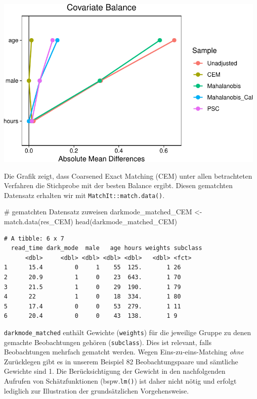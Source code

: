 \documentclass[
  a4paper,
  DIV=11,
  oneside]{scrreprt}
\newenvironment{Shaded}{\begin{snugshade}}{\end{snugshade}}
\newcommand{\CommentTok}[1]{\textcolor[rgb]{0.37,0.37,0.37}{#1}}
\newcommand{\FunctionTok}[1]{\textcolor[rgb]{0.28,0.35,0.67}{#1}}
\newcommand{\NormalTok}[1]{\textcolor[rgb]{0.00,0.23,0.31}{#1}}
\newcommand{\OtherTok}[1]{\textcolor[rgb]{0.00,0.23,0.31}{#1}}
\begin{document}
\includegraphics{Matching_files/figure-pdf/unnamed-chunk-37-1.pdf}

Die Grafik zeigt, dass Coarsened Exact Matching (CEM) unter allen
betrachteten Verfahren die Stichprobe mit der besten Balance ergibt.
Diesen gematchten Datensatz erhalten wir mit
\texttt{MatchIt::match.data()}.

\begin{Shaded}
\begin{Highlighting}[]
\CommentTok{\# gematchten Datensatz zuweisen}
\NormalTok{darkmode\_matched\_CEM }\OtherTok{\textless{}{-}} \FunctionTok{match.data}\NormalTok{(res\_CEM)}
\FunctionTok{head}\NormalTok{(darkmode\_matched\_CEM)}
\end{Highlighting}
\end{Shaded}

\begin{verbatim}
# A tibble: 6 x 7
  read_time dark_mode  male   age hours weights subclass
      <dbl>     <dbl> <dbl> <dbl> <dbl>   <dbl> <fct>   
1      15.4         0     1    55  125.       1 26      
2      20.9         1     0    23  643.       1 70      
3      21.5         1     0    29  190.       1 79      
4      22           1     0    18  334.       1 80      
5      17.4         0     0    53  279.       1 11      
6      20.4         0     0    43  138.       1 9       
\end{verbatim}

\texttt{darkmode\_matched} enthält Gewichte (\texttt{weights}) für die
jeweilige Gruppe zu denen gemachte Beobachtungen gehören
(\texttt{subclass}). Dies ist relevant, falls Beobachtungen mehrfach
gematcht werden. Wegen Eins-zu-eins-Matching \emph{ohne} Zurücklegen
gibt es in unserem Beispiel 82 Beobachtungspaare und sämtliche Gewichte
sind 1. Die Berücksichtigung der Gewicht in den nachfolgenden Aufrufen
von Schätzfunktionen (bspw.\texttt{lm()}) ist daher nicht nötig und
erfolgt lediglich zur Illustration der grundsätzlichen Vorgehensweise.
\end{document}
